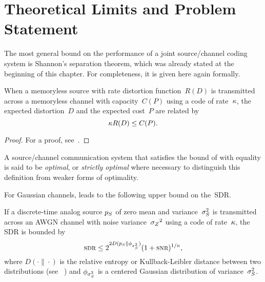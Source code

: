 \section{Theoretical Limits and Problem Statement}\label{sec:limits}

The most general bound on the performance of a joint source/channel coding
system is Shannon's separation theorem, which was already stated at the
beginning of this chapter.  For completeness, it is given here again formally.

\begin{theorem}
  \label{thm:sepconverse}
  When a memoryless source with rate distortion function~$R(D)$ is transmitted
  across a memoryless channel with capacity~$C(P)$ using a code of rate~$\kappa$,
  the expected distortion~$D$ and the expected cost~$P$ are related by
  \begin{equation}
    \label{eq:sepconverse}
    \kappa R(D) \le C(P).
  \end{equation}
\end{theorem}

\begin{proof}
  For a proof, see~\cite[Theorem~9.6.1]{Gallager1968}.
\end{proof}

\begin{definition}
  \label{def:optimalcode}
  A source/channel communication system that satisfies the bound of
   with equality is said to be \emph{optimal}, or
  \emph{strictly optimal} where necessary to distinguish this definition from
  weaker forms of optimality.
\end{definition}

For Gaussian channels,  leads to the following upper bound
on the~SDR.
\begin{theorem}
  \label{thm:sdrub}
  If a discrete-time analog source ${p_S}$ of zero mean and variance~${\sigma_S^2}$ is
  transmitted across an AWGN channel with noise variance~${{\sigma_Z}^2}$ using a code of
  rate~$\kappa$, the SDR is bounded by
  \begin{equation}
    \label{eq:sdrub}
    \sdr \le 2^{2 D(\pS \| \phi_{\ssq})} (1 + \snr)^{1/\k},
  \end{equation}
  where $D(\cdot \| \cdot)$ is the relative entropy or Kullback-Leibler distance
  between two distributions (see \eg~\cite{CoverT1991}) and $\phi_{{\sigma_S^2}}$ is a
  centered Gaussian distribution of variance~${\sigma_S^2}$.
\end{theorem}

